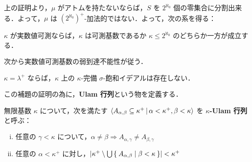\documentclass[a4j]{jsarticle}
\begin{document}
上の証明より，$\mu$ がアトムを持たないならば，$S$ を $2^{\aleph_0}$ 個の零集合に分割出来る．よって，$\mu$ は $(2^{\aleph_0})^+$-加法的ではない．よって，次の系を得る：

\begin{corollary}
 $\kappa$ が実数値可測ならば，$\kappa$ は可測基数であるか $\kappa \leq 2^{\aleph_0}$ のどちらか一方が成立する．
\end{corollary}

次から実数値可測基数の弱到達不能性が従う．

\begin{lemma}
 $\kappa = \lambda^+$ ならば，$\kappa$ 上の $\kappa$-完備 $\sigma$-飽和イデアルは存在しない．
\end{lemma}

この補題の証明の為に，{\bfseries Ulam 行列}という物を定義する．

\begin{definition}[Ulam 行列]
 無限基数 $\kappa$ について，次を満たす $\Braket{A_{\alpha, \beta} \subseteq \kappa^+ | \alpha < \kappa^+, \beta < \kappa }$ を {\bfseries $\kappa$-Ulam 行列} と呼ぶ：
 \begin{enumerate}[(i)]
 \item 任意の $\gamma < \kappa$ について，$\alpha \neq \beta \Rightarrow A_{\alpha,\gamma} \neq A_{\beta, \gamma}$
 \item 任意の $\alpha < \kappa^+$ に対し，$\left|\kappa^+ \setminus \bigcup\Set{A_{\alpha, \beta} | \beta < \kappa}\right| < \kappa^+$
 \end{enumerate}
\end{definition}
\end{document}
